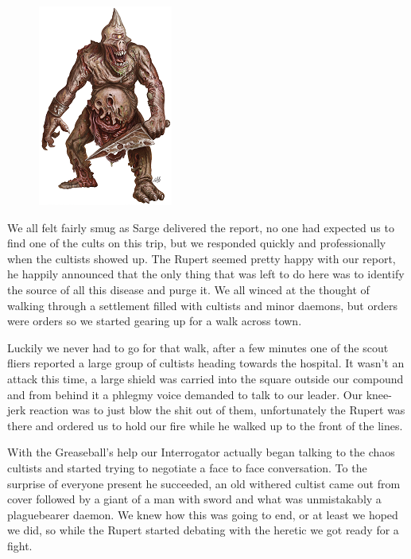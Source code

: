 \begin{figure}
	\begin{center}
		\includegraphics[width=\figwidth]{pics/6/26.png}
	\end{center}
\end{figure}
We all felt fairly smug as Sarge delivered the report, no one had expected us to find one of the cults on this trip, but we responded quickly and professionally when the cultists showed up. 
The Rupert seemed pretty happy with our report, he happily announced that the only thing that was left to do here was to identify the source of all this disease and purge it. 
We all winced at the thought of walking through a settlement filled with cultists and minor daemons, but orders were orders so we started gearing up for a walk across town.

Luckily we never had to go for that walk, after a few minutes one of the scout fliers reported a large group of cultists heading towards the hospital. 
It wasn't an attack this time, a large shield was carried into the square outside our compound and from behind it a phlegmy voice demanded to talk to our leader. 
Our knee-jerk reaction was to just blow the shit out of them, unfortunately the Rupert was there and ordered us to hold our fire while he walked up to the front of the lines.

With the Greaseball's help our Interrogator actually began talking to the chaos cultists and started trying to negotiate a face to face conversation. 
To the surprise of everyone present he succeeded, an old withered cultist came out from cover followed by a giant of a man with sword and what was unmistakably a plaguebearer daemon. 
We knew how this was going to end, or at least we hoped we did, so while the Rupert started debating with the heretic we got ready for a fight.

